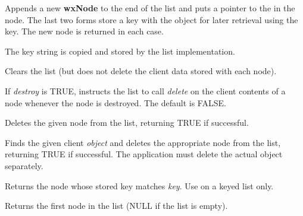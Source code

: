 

Appends a new {\bf wxNode} to the end of the list and puts a pointer to the
 in the node.  The last two forms store a key with the object for
later retrieval using the key. The new node is returned in each case.

The key string is copied and stored by the list implementation.



Clears the list (but does not delete the client data stored with each node).

\label{wxlistdeletecontents}


If {\it destroy} is TRUE, instructs the list to call {\it delete} on the client contents of
a node whenever the node is destroyed. The default is FALSE.



Deletes the given node from the list, returning TRUE if successful.



Finds the given client {\it object} and deletes the appropriate node from the list, returning
TRUE if successful. The application must delete the actual object separately.




Returns the node whose stored key matches {\it key}. Use on a keyed list only.



Returns the first node in the list (NULL if the list is empty).


